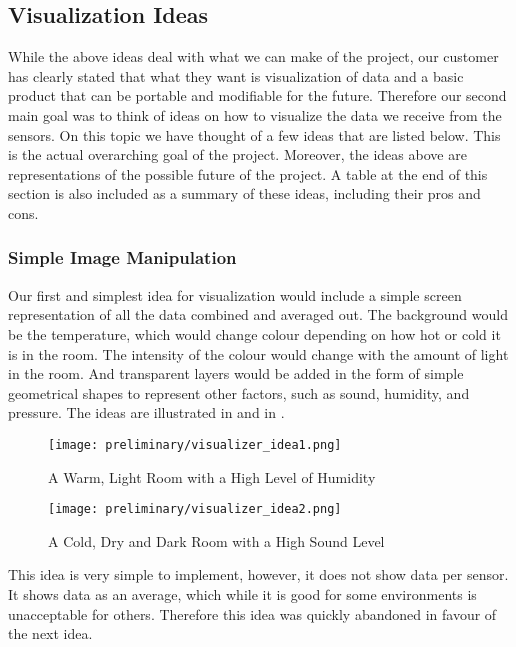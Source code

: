 \documentclass[../document]{subfiles}
\begin{document}
\subsection{Visualization Ideas}
While the above ideas deal with what we can make of the project, our customer has clearly stated that what they want is visualization of data and a basic product that can be portable and modifiable for the future. Therefore our second main goal was to think of ideas on how to visualize the data we receive from the sensors. On this topic we have thought of a few ideas that are listed below. This is the actual overarching goal of the project. Moreover, the ideas above are representations of the possible future of the project. A table at the end of this section is also included as a summary of these ideas, including their pros and cons.

\subsubsection{Simple Image Manipulation}
Our first and simplest idea for visualization would include a simple screen representation of all the data combined and averaged out. The background would be the temperature, which would change colour depending on how hot or cold it is in the room. The intensity of the colour would change with the amount of light in the room. And transparent layers would be added in the form of simple geometrical shapes to represent other factors, such as sound, humidity, and pressure. The ideas are illustrated in   and in .

\begin{figure}
	\texttt{[image: preliminary/visualizer\_idea1.png]}
	\caption{A Warm, Light Room with a High Level of Humidity}
	\label{fig:visualizer_idea1}
\end{figure}

\begin{figure}
	\texttt{[image: preliminary/visualizer\_idea2.png]}
	\caption{A Cold, Dry and Dark Room with a High Sound Level}
	\label{fig:visualizer_idea2}
\end{figure}

This idea is very simple to implement, however, it does not show data per sensor. It shows data as an average, which while it is good for some environments is unacceptable for others. Therefore this idea was quickly abandoned in favour of the next idea.
\end{document}
